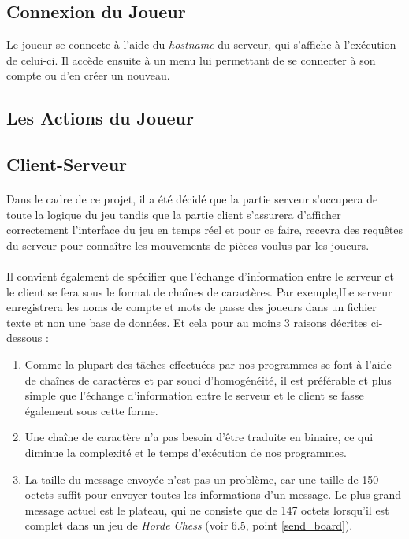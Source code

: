 \documentclass[10pt, a4paper]{article}
\begin{document}
\newpage

\subsection{Connexion du Joueur}
Le joueur se connecte à l'aide du \textit{hostname} du serveur, qui s'affiche à l'exécution de celui-ci. Il accède ensuite à un menu lui permettant de se connecter à son compte ou d'en créer un nouveau.

\subsection{Les Actions du Joueur}

\subsection{Client-Serveur}
\paragraph{}Dans le cadre de ce projet, il a été décidé que la partie serveur s'occupera de toute la logique du jeu tandis que la partie client s'assurera d'afficher correctement l'interface du jeu en temps réel et pour ce faire, recevra des requêtes du serveur pour connaître les mouvements de pièces voulus par les joueurs.
\paragraph{}Il convient également de spécifier que l'échange d'information entre le serveur et le client se fera sous le format de chaînes de caractères. Par exemple,lLe serveur enregistrera les noms de compte et mots de passe des joueurs dans un fichier texte et non une base de données. Et cela pour au moins 3 raisons décrites ci-dessous :
\begin{enumerate}
\item Comme la plupart des tâches effectuées par nos programmes se font à l'aide de chaînes de caractères et par souci d'homogénéité, il est préférable et plus simple que l'échange d'information entre le serveur et le client se fasse également sous cette forme.
\item Une chaîne de caractère n'a pas besoin d'être traduite en binaire, ce qui diminue la complexité et le temps d'exécution de nos programmes.
\item La taille du message envoyée n'est pas un problème, car une taille de 150 octets suffit pour envoyer toutes les informations d'un message. Le plus grand message actuel est le plateau, qui ne consiste que de 147 octets lorsqu'il est complet dans un jeu de \textit{Horde Chess} (voir 6.5, point \ref{send_board}).
\end{enumerate}
\end{document}
